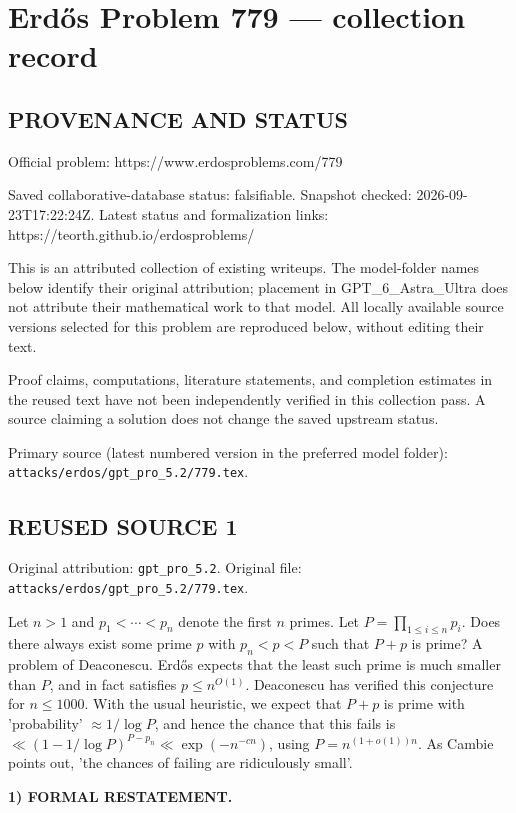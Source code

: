\section*{Erd\H{o}s Problem 779 --- collection record}

\subsection*{PROVENANCE AND STATUS}
Official problem: https://www.erdosproblems.com/779

Saved collaborative-database status: falsifiable.
Snapshot checked: 2026-09-23T17:22:24Z.
Latest status and formalization links: https://teorth.github.io/erdosproblems/

This is an attributed collection of existing writeups. The model-folder names below identify their original attribution; placement in GPT\_6\_Astra\_Ultra does not attribute their mathematical work to that model. All locally available source versions selected for this problem are reproduced below, without editing their text.

Proof claims, computations, literature statements, and completion estimates in the reused text have not been independently verified in this collection pass. A source claiming a solution does not change the saved upstream status.

Primary source (latest numbered version in the preferred model folder): \texttt{attacks/erdos/gpt\_pro\_5.2/779.tex}.

\subsection*{REUSED SOURCE 1}
Original attribution: \texttt{gpt\_pro\_5.2}.
Original file: \texttt{attacks/erdos/gpt\_pro\_5.2/779.tex}.


Let $n> 1$ and $p_1<\cdots<p_n$ denote the first $n$ primes. Let $P=\prod_{1\leq i\leq n}p_i$. Does there always exist some prime $p$ with $p_n<p<P$ such that $P+p$ is prime? A problem of Deaconescu. Erd\H{o}s expects that the least such prime is much smaller than $P$, and in fact satisfies $p\leq n^{O(1)}$. Deaconescu has verified this conjecture for $n\leq 1000$. With the usual heuristic, we expect that $P+p$ is prime with 'probability' $\approx 1/\log P$, and hence the chance that this fails is $\ll (1-1/\log P)^{P-p_n}\ll \exp(-n^{-cn})$, using $P=n^{(1+o(1))n}$. As Cambie points out, 'the chances of failing are ridiculously small'.


\noindent\textbf{1) FORMAL RESTATEMENT.}


